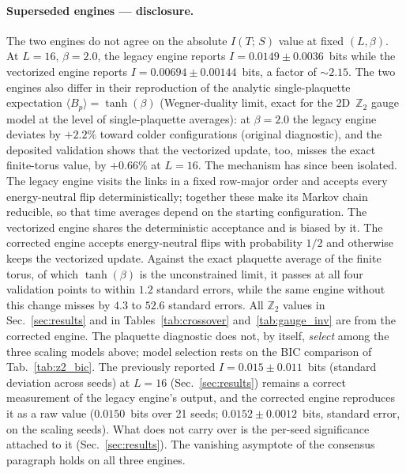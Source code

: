 \documentclass[aps,pra,twocolumn,superscriptaddress,showpacs,floatfix]{revtex4-2}
\newcommand{\Ztwo}{\mathbb{Z}_2}
\newcommand{\MI}{I(T;\,S)}
\begin{document}
\paragraph{Superseded engines --- disclosure.}
The two engines do not agree on the absolute $\MI$ value at fixed $(L,\beta)$.
At $L=16$, $\beta=2.0$, the legacy engine reports $I = 0.0149 \pm 0.0036$~bits
while the vectorized engine reports $I = 0.00694 \pm 0.00144$~bits, a factor of
$\sim 2.15$. The two engines also differ in their reproduction of the analytic
single-plaquette expectation $\langle B_p \rangle = \tanh(\beta)$
(Wegner-duality limit, exact for the 2D~$\Ztwo$ gauge model at the level of
single-plaquette averages): at $\beta=2.0$ the legacy engine deviates by $+2.2\%$ toward colder configurations (original diagnostic), and the deposited validation shows that the vectorized update, too, misses the exact finite-torus value, by $+0.66\%$ at $L = 16$. The mechanism has since been isolated. The legacy engine visits the links in a fixed row-major order and accepts every energy-neutral flip deterministically; together these make its Markov chain reducible, so that time averages depend on the starting configuration. The vectorized engine shares the deterministic acceptance and is biased by it. The corrected engine accepts energy-neutral flips with probability $1/2$ and otherwise keeps the vectorized update. Against the exact plaquette average of the finite torus, of which $\tanh(\beta)$ is the unconstrained limit, it passes at all four validation points to within $1.2$ standard errors, while the same engine without this change misses by $4.3$ to $52.6$ standard errors. All $\Ztwo$ values in Sec.~\ref{sec:results} and in Tables~\ref{tab:crossover} and~\ref{tab:gauge_inv} are from the corrected engine. The plaquette diagnostic does not, by itself, \emph{select} among the
three scaling models above; model selection rests on the BIC comparison of
Tab.~\ref{tab:z2_bic}. The previously reported $I = 0.015 \pm 0.011$~bits (standard deviation across seeds) at $L=16$ (Sec.~\ref{sec:results}) remains a correct measurement of the legacy engine's output, and the corrected engine reproduces it as a raw value ($0.0150$~bits over 21 seeds; $0.0152 \pm 0.0012$~bits, standard error, on the scaling seeds). What does not carry over is the per-seed significance attached to it (Sec.~\ref{sec:results}). The vanishing asymptote of the consensus paragraph holds on all three engines.
\end{document}
